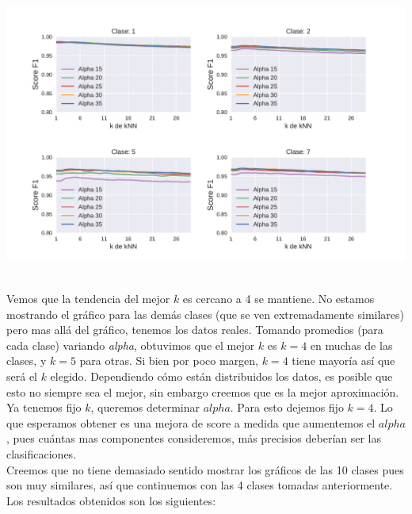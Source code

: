{\centering
    \includegraphics[scale=0.65]{informe/imagenes/pca/variacionKClases1257.pdf} \\
}
$ $\newline

Vemos que la tendencia del mejor $k$ es cercano a 4 se mantiene. No estamos mostrando el gráfico para las demás clases (que se ven extremadamente similares) pero mas allá del gráfico, tenemos los datos reales. Tomando promedios (para cada clase) variando \textit{alpha}, obtuvimos que el mejor $k$ es $k=4$ en muchas de las clases, y $k=5$ para otras. Si bien por poco margen, $k=4$ tiene mayoría así que será el $k$ elegido. Dependiendo cómo están distribuidos los datos, es posible que esto no siempre sea el mejor, sin embargo creemos que es la mejor aproximación. \\

Ya tenemos fijo $k$, queremos determinar $alpha$. Para esto dejemos fijo $k=4$. Lo que esperamos obtener es una mejora de score a medida que aumentemos el $alpha$, pues cuántas mas componentes consideremos, más precisios deberían ser las clasificaciones. \\

Creemos que no tiene demasiado sentido mostrar los gráficos de las 10 clases pues son muy similares, así que continuemos con las 4 clases tomadas anteriormente. Los resultados obtenidos son los siguientes: \\

